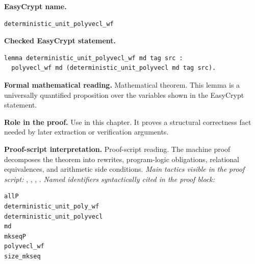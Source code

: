 \begin{formaltheorem}
\noindent\textbf{EasyCrypt name.}
\begin{lstlisting}[language=EasyCrypt,basicstyle=\ttfamily\scriptsize]
deterministic_unit_polyvecl_wf
\end{lstlisting}
\noindent\textbf{Checked EasyCrypt statement.}
\begin{lstlisting}[language=EasyCrypt,basicstyle=\ttfamily\scriptsize]
lemma deterministic_unit_polyvecl_wf md tag src :
  polyvecl_wf md (deterministic_unit_polyvecl md tag src).
\end{lstlisting}
\noindent\textbf{Formal mathematical reading.}
Mathematical theorem. This lemma is a universally quantified proposition over the variables shown in the EasyCrypt statement.

\noindent\textbf{Role in the proof.}
Use in this chapter. It proves a structural correctness fact needed by later extraction or verification arguments.

\noindent\textbf{Proof-script interpretation.}
Proof-script reading. The machine proof decomposes the theorem into rewrites, program-logic obligations, relational equivalences, and arithmetic side conditions.
\emph{Main tactics visible in the proof script:} , , , .
\emph{Named identifiers syntactically cited in the proof block:}
\begin{lstlisting}[language=EasyCrypt,basicstyle=\ttfamily\scriptsize]
allP
deterministic_unit_poly_wf
deterministic_unit_polyvecl
md
mkseqP
polyvecl_wf
size_mkseq
\end{lstlisting}

\end{formaltheorem}

